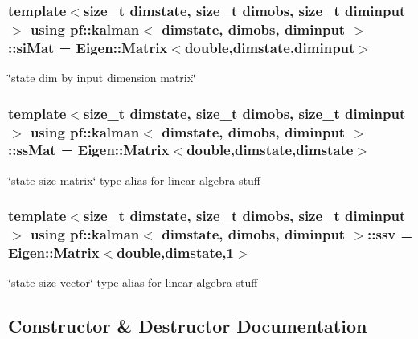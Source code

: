 \subsubsection[{\texorpdfstring{si\+Mat}{siMat}}]{\setlength{\rightskip}{0pt plus 5cm}template$<$size\+\_\+t dimstate, size\+\_\+t dimobs, size\+\_\+t diminput$>$ using {\bf pf\+::kalman}$<$ dimstate, dimobs, diminput $>$\+::{\bf si\+Mat} =  Eigen\+::\+Matrix$<$double,dimstate,diminput$>$\hspace{0.3cm}{\ttfamily [private]}}\hypertarget{classpf_1_1kalman_afc940e82542b4dcce4a0834297d98781}{}\label{classpf_1_1kalman_afc940e82542b4dcce4a0834297d98781}
\char`\"{}state dim by input dimension matrix\char`\"{} 
\subsubsection[{\texorpdfstring{ss\+Mat}{ssMat}}]{\setlength{\rightskip}{0pt plus 5cm}template$<$size\+\_\+t dimstate, size\+\_\+t dimobs, size\+\_\+t diminput$>$ using {\bf pf\+::kalman}$<$ dimstate, dimobs, diminput $>$\+::{\bf ss\+Mat} =  Eigen\+::\+Matrix$<$double,dimstate,dimstate$>$\hspace{0.3cm}{\ttfamily [private]}}\hypertarget{classpf_1_1kalman_aff9ecb9b57dfc3f115a372a765781561}{}\label{classpf_1_1kalman_aff9ecb9b57dfc3f115a372a765781561}
\char`\"{}state size matrix\char`\"{} type alias for linear algebra stuff 
\subsubsection[{\texorpdfstring{ssv}{ssv}}]{\setlength{\rightskip}{0pt plus 5cm}template$<$size\+\_\+t dimstate, size\+\_\+t dimobs, size\+\_\+t diminput$>$ using {\bf pf\+::kalman}$<$ dimstate, dimobs, diminput $>$\+::{\bf ssv} =  Eigen\+::\+Matrix$<$double,dimstate,1$>$\hspace{0.3cm}{\ttfamily [private]}}\hypertarget{classpf_1_1kalman_a5b389e6a5e41f4ad81d4ba115d9aa823}{}\label{classpf_1_1kalman_a5b389e6a5e41f4ad81d4ba115d9aa823}
\char`\"{}state size vector\char`\"{} type alias for linear algebra stuff 

\subsection{Constructor \& Destructor Documentation}
